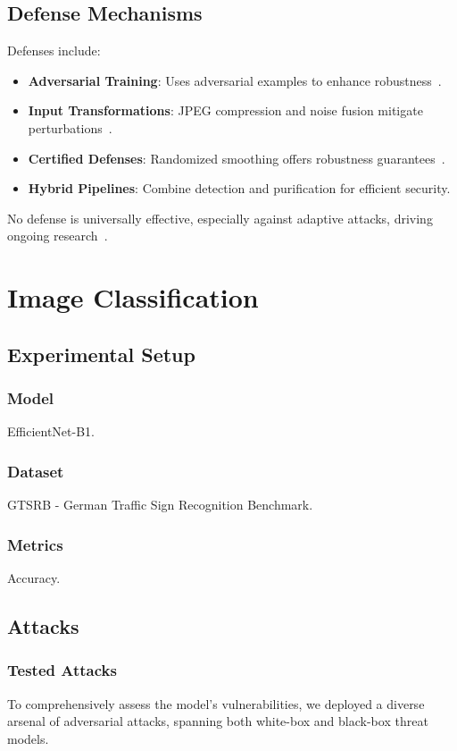 \documentclass[conference]{IEEEtran}
\begin{document}
\subsection{Defense Mechanisms}
Defenses include:
\begin{itemize}
    \item \textbf{Adversarial Training}: Uses adversarial examples to enhance robustness~\cite{madry2018towardspgd}.
    \item \textbf{Input Transformations}: JPEG compression and noise fusion mitigate perturbations~\cite{das2017keepingbadguysout}.
    \item \textbf{Certified Defenses}: Randomized smoothing offers robustness guarantees~\cite{cohen2019certified}.
    \item \textbf{Hybrid Pipelines}: Combine detection and purification for efficient security.
\end{itemize}
No defense is universally effective, especially against adaptive attacks, driving ongoing research~\cite{akhtar2018threatadversarialattacksdeep}.

\section{Image Classification}
\subsection{Experimental Setup}
\subsubsection{Model}
EfficientNet-B1.
\subsubsection{Dataset}
GTSRB - German Traffic Sign Recognition Benchmark.
\subsubsection{Metrics}
Accuracy.
\subsection{Attacks}
\subsubsection{Tested Attacks}
To comprehensively assess the model's vulnerabilities, we deployed a diverse arsenal of adversarial attacks, spanning both white-box and black-box threat models.
\end{document}
